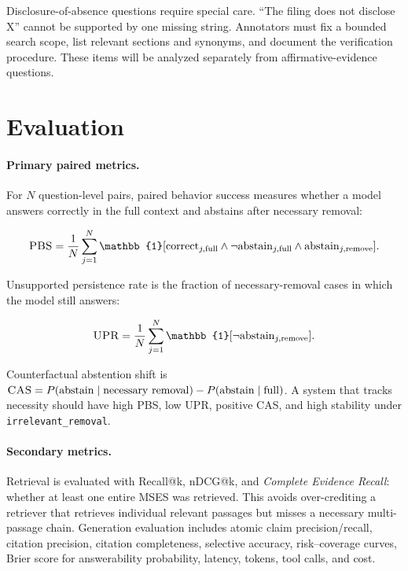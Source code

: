 \documentclass{article}
\newcommand{\mses}{\textsc{MSES}}
\newcommand{\pbs}{\textsc{PBS}}
\newcommand{\upr}{\textsc{UPR}}
\newcommand{\cas}{\textsc{CAS}}
\begin{document}
Disclosure-of-absence questions require special care. ``The filing does not
disclose X'' cannot be supported by one missing string. Annotators must fix a
bounded search scope, list relevant sections and synonyms, and document the
verification procedure. These items will be analyzed separately from
affirmative-evidence questions.

\section{Evaluation}

\paragraph{Primary paired metrics.}
For $N$ question-level pairs, paired behavior success measures whether a model
answers correctly in the full context and abstains after necessary removal:

\begin{equation}
\pbs=\frac{1}{N}\sum_{j=1}^{N}\mathbb{1}[\mathrm{correct}_{j,\mathrm{full}}
\wedge \neg\mathrm{abstain}_{j,\mathrm{full}}
\wedge \mathrm{abstain}_{j,\mathrm{remove}}].
\end{equation}

Unsupported persistence rate is the fraction of necessary-removal cases in
which the model still answers:

\begin{equation}
\upr=\frac{1}{N}\sum_{j=1}^{N}\mathbb{1}[\neg\mathrm{abstain}_{j,\mathrm{remove}}].
\end{equation}

Counterfactual abstention shift is
$\cas=P(\mathrm{abstain}\mid\mathrm{necessary\ removal})-
P(\mathrm{abstain}\mid\mathrm{full})$. A system that tracks necessity should
have high \pbs{}, low \upr{}, positive \cas{}, and high stability under
\texttt{irrelevant\_removal}.

\paragraph{Secondary metrics.}
Retrieval is evaluated with Recall@k, nDCG@k, and \emph{Complete Evidence
Recall}: whether at least one entire \mses{} was retrieved. This avoids
over-crediting a retriever that retrieves individual relevant passages but
misses a necessary multi-passage chain. Generation evaluation includes atomic
claim precision/recall, citation precision, citation completeness, selective
accuracy, risk--coverage curves, Brier score for answerability probability,
latency, tokens, tool calls, and cost.
\end{document}
